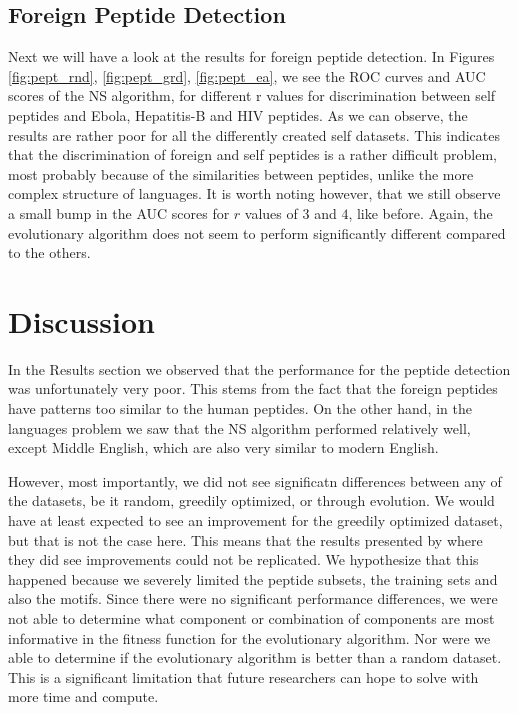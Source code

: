 \documentclass{article}
\begin{document}
\subsection{Foreign Peptide Detection}
Next we will have a look at the results for foreign peptide detection. In Figures \ref{fig:pept_rnd}, \ref{fig:pept_grd}, 
\ref{fig:pept_ea},  we see the ROC curves and AUC scores of the NS algorithm, for different r values for discrimination 
between self peptides and Ebola, Hepatitis-B and HIV peptides. As we can observe, the results are rather poor for all 
the differently created self datasets. This indicates that the discrimination of foreign and self peptides is a rather 
difficult problem, most probably because of the similarities between peptides, unlike the more complex structure of 
languages. It is worth noting however, that we still observe a small bump in the AUC scores for $r$ values of $3$ and 
$4$, like before. Again, the evolutionary algorithm does not seem to perform significantly different compared to the others.

\section{Discussion}
In the Results section we observed that the performance for the peptide detection was unfortunately very poor. This stems
from the fact that the foreign peptides have patterns too similar to the human peptides. On the other hand, in the 
languages problem we saw that the NS algorithm performed relatively well, except Middle English, which are also very 
similar to modern English. 


However, most importantly, we did not see significatn differences between any of the datasets, be it random, greedily optimized, or through evolution.
We would have at least expected to see an improvement for the greedily optimized dataset, but that is not the case here.
This means that the results presented by \textcite{wortel2020t} where they did see improvements could not be replicated.
We hypothesize that this happened because we severely limited the peptide subsets, the training sets and also the motifs.
Since there were no significant performance differences, we were not able to determine what component or combination of components are most informative in the fitness function for the evolutionary algorithm.
Nor were we able to determine if the evolutionary algorithm is better than a random dataset.
This is a significant limitation that future researchers can hope to solve with more time and compute.
\end{document}
